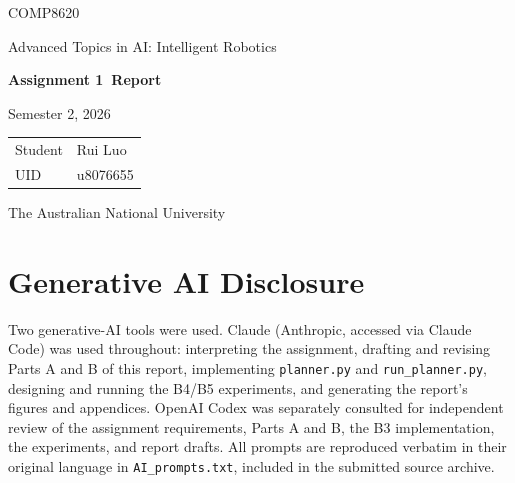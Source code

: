 \documentclass[11pt,a4paper]{article}
\newcommand{\studentname}{Rui Luo}
\newcommand{\studentuid}{u8076655}
\newcommand{\coursecode}{COMP8620}
\newcommand{\coursetitle}{Advanced Topics in AI: Intelligent Robotics}
\newcommand{\assignmenttitle}{Assignment 1}
\newcommand{\semester}{Semester 2, 2026}
\begin{document}

\begin{titlepage}
  \centering
  \vspace*{30mm}
  {\Large\coursecode\par}
  \vspace{4mm}
  {\Large\coursetitle\par}
  \vspace{16mm}
  {\huge\bfseries\assignmenttitle\ Report\par}
  \vspace{5mm}
  {\large\semester\par}
  \vfill

  \begin{tabular}{@{}ll@{}}
    \toprule
    Student & \studentname \\
    UID & \studentuid \\
    \bottomrule
  \end{tabular}

  \vfill
  {\large The Australian National University\par}
  \vspace{10mm}
\end{titlepage}


\section*{Generative AI Disclosure}
\label{sec:ai-disclosure}

Two generative-AI tools were used. Claude (Anthropic, accessed via Claude
Code) was used throughout: interpreting the assignment, drafting and
revising Parts A and B of this report, implementing \texttt{planner.py} and
\texttt{run\_planner.py}, designing and running the B4/B5 experiments, and
generating the report's figures and appendices. OpenAI Codex was
separately consulted for independent review of the assignment requirements,
Parts A and B, the B3 implementation, the experiments, and report drafts.
All prompts are reproduced verbatim in their original language in
\texttt{AI\_prompts.txt}, included in the submitted source archive.
\end{document}
